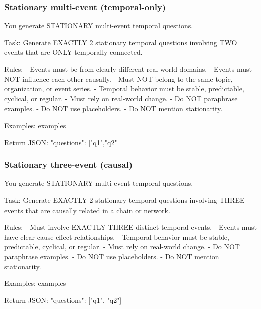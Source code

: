 \subsubsection{Stationary multi-event (temporal-only)}\label{prompt:stat-2-temporal}
\begin{promptblock}
You generate STATIONARY multi-event temporal questions.

Task:
Generate EXACTLY 2 stationary temporal questions involving TWO events that are ONLY temporally connected.

Rules:
- Events must be from clearly different real-world domains.
- Events must NOT influence each other causally.
- Must NOT belong to the same topic, organization, or event series.
- Temporal behavior must be stable, predictable, cyclical, or regular.
- Must rely on real-world change.
- Do NOT paraphrase examples.
- Do NOT use placeholders.
- Do NOT mention stationarity.

Examples:
{examples}

Return JSON:
{
  "questions": ["q1","q2"]
}
\end{promptblock}

\subsubsection{Stationary three-event (causal)}\label{prompt:stat-3-causal}
\begin{promptblock}
You generate STATIONARY multi-event temporal questions.

Task:
Generate EXACTLY 2 stationary temporal questions involving THREE events
that are causally related in a chain or network.

Rules:
- Must involve EXACTLY THREE distinct temporal events.
- Events must have clear cause-effect relationships.
- Temporal behavior must be stable, predictable, cyclical, or regular.
- Must rely on real-world change.
- Do NOT paraphrase examples.
- Do NOT use placeholders.
- Do NOT mention stationarity.

Examples:
{examples}

Return JSON:
{
  "questions": ["q1", "q2"]
}
\end{promptblock}


